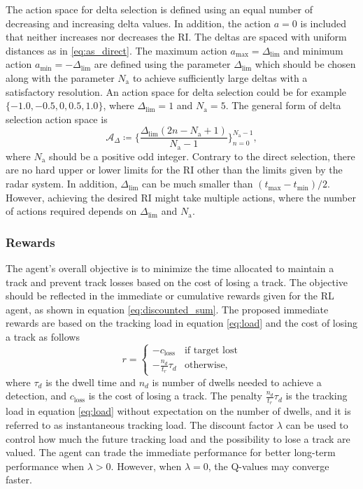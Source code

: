 \documentclass[english, 12pt, a4paper, elec, utf8, a-1b, online]{aaltothesis}
\numberwithin{equation}{section}
\newcommand{\amax}{a_\text{max}}
\newcommand{\amin}{a_\text{min}}
\newcommand{\As}{\mathcal{A}}
\newcommand{\tmax}{t_\text{max}}
\newcommand{\tmin}{t_\text{min}}
\newcommand{\deltalim}{\Delta_\text{lim}}
\newcommand{\Asdelta}{\As_\Delta}
\newcommand{\nacts}{{N_\text{a}}}
\newcommand{\closs}{c_\text{loss}}
\newcommand{\ri}{t_r}
\begin{document}
The action space for delta selection is defined using an equal number of decreasing and increasing delta values. 
In addition, the action $a=0$ is included that neither increases nor decreases the RI.
The deltas are spaced with uniform distances as in \eqref{eq:as_direct}.
The maximum action $\amax=\deltalim$ and minimum action $\amin=-\deltalim$ are defined using the parameter $\deltalim$ which should be chosen along with the parameter $\nacts$ to achieve sufficiently large deltas with a satisfactory resolution.
An action space for delta selection could be for example $\{ -1.0, -0.5, 0, 0.5, 1.0 \}$, where $\deltalim=1$ and $\nacts=5$.
The general form of delta selection action space is
\begin{equation}\label{eq:as_delta}
    \Asdelta \coloneqq \{ \frac{\deltalim \left( 2 n - \nacts + 1 \right)}{\nacts-1} \}_{n=0}^{\nacts-1},
\end{equation}
where $\nacts$ should be a positive odd integer.
Contrary to the direct selection, there are no hard upper or lower limits for the RI other than the limits given by the radar system.
In addition, $\deltalim$ can be much smaller than $\left(\tmax - \tmin\right)/2$.
However, achieving the desired RI might take multiple actions, where the number of actions required depends on $\deltalim$ and $\nacts$.

\subsubsection{Rewards} \label{sec:rewards}

The agent's overall objective is to minimize the time allocated to maintain a track and prevent track losses based on the cost of losing a track.
The objective should be reflected in the immediate or cumulative rewards given for the RL agent, as shown in equation \eqref{eq:discounted_sum}. 
The proposed immediate rewards are based on the tracking load in equation \eqref{eq:load} and the cost of losing a track as follows
\begin{equation}
    r = \left\{
    \begin{array}{ll}
        -\closs & \text{if target lost} \\
        -\frac{n_d}{\ri} \tau_d & \text{otherwise},
    \end{array} \right.
\end{equation}
where $\tau_d$ is the dwell time and $n_d$ is number of dwells needed to achieve a detection, and $\closs$ is the cost of losing a track.
The penalty $\frac{n_d}{\ri}\tau_d$ is the tracking load in equation \eqref{eq:load} without expectation on the number of dwells, and it is referred to as instantaneous tracking load.
The discount factor $\lambda$ can be used to control how much the future tracking load and the possibility to lose a track are valued.
The agent can trade the immediate performance for better long-term performance when $\lambda > 0$.
However, when $\lambda = 0$, the Q-values may converge faster.
\end{document}
